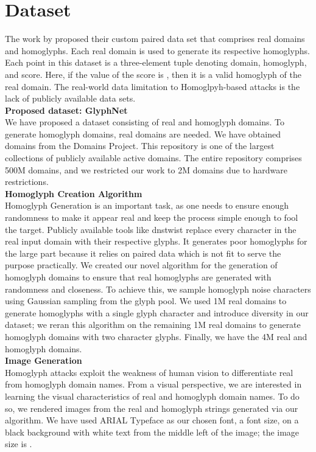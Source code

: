 \documentclass[letterpaper]{article} \usepackage{aaai22}  \usepackage{times}  \usepackage{helvet}  \usepackage{courier}  \usepackage[hyphens]{url}  \usepackage{graphicx} \urlstyle{rm} \def\UrlFont{\rm}  \usepackage{natbib}  \usepackage{caption} \DeclareCaptionStyle{ruled}{labelfont=normalfont,labelsep=colon,strut=off} \frenchspacing  \setlength{\pdfpagewidth}{8.5in}  \setlength{\pdfpageheight}{11in}  \usepackage{algorithm}
\begin{document}
\section{Dataset}
The work by \cite{woodbridge2018detecting} proposed their custom paired data set that comprises  real domains and  homoglyphs. Each real domain is used to generate its respective homoglyphs. Each point in this dataset is a three-element tuple denoting domain, homoglyph, and score. Here, if the value of the score is , then it is a valid homoglyph of the real domain. The real-world data limitation to Homoglpyh-based attacks is the lack of publicly available data sets. \\

\textbf{Proposed dataset: GlyphNet} \\
We have proposed a dataset consisting of real and homoglyph domains. To generate homoglyph domains, real domains are needed. We have obtained domains from the Domains Project\cite{tb0hdand18:online}. This repository is one of the largest collections of publicly available active domains. The entire repository comprises 500M domains, and we restricted our work to 2M domains due to hardware restrictions. \\

\textbf{Homoglyph Creation Algorithm} \\
Homoglyph Generation is an important task, as one needs to ensure enough randomness to make it appear real and keep the process simple enough to fool the target. Publicly available tools like dnstwist\cite{elceefdn36:online} replace every character in the real input domain with their respective glyphs. It generates poor homoglyphs for the large part because it relies on paired data which is not fit to serve the purpose practically. We created our novel algorithm for the generation of homoglyph domains to ensure that real homoglyphs are generated with randomness and closeness. To achieve this, we sample homoglyph noise characters using Gaussian sampling\cite{boor1999gaussian} from the glyph pool. We used 1M real domains to generate  homoglyphs with a single glyph character and introduce diversity in our dataset; we reran this algorithm on the remaining 1M real domains to generate homoglyph domains with two character glyphs. Finally, we have the 4M real and homoglyph domains. \\

\textbf{Image Generation} \\
Homoglyph attacks exploit the weakness of human vision to differentiate real from homoglyph domain names. From a visual perspective, we are interested in learning the visual characteristics of real and homoglyph domain names. To do so, we rendered images from the real and homoglyph strings generated via our algorithm. We have used ARIAL Typeface as our chosen font, a  font size, on a black background with white text from the middle left of the image; the image size is . 
\end{document}
